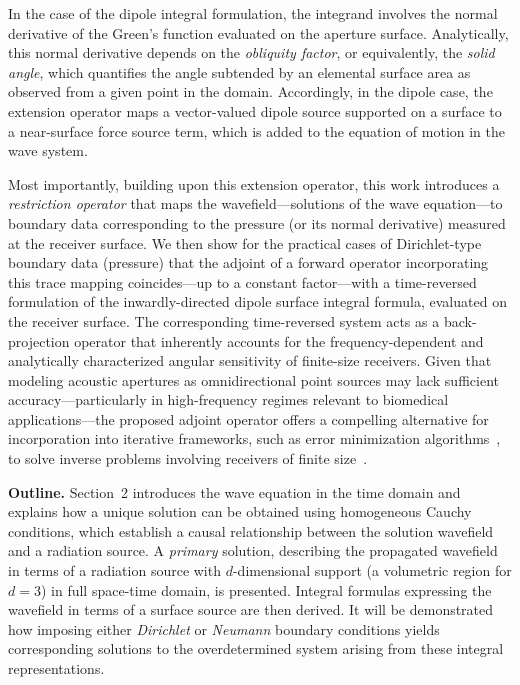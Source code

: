 \documentclass[11pt,reqno]{amsart}
\theoremstyle{remark}
\theoremstyle{italic_lemma}
\begin{document}
In the case of the dipole integral formulation, the integrand involves the normal derivative of the Green's function evaluated on the aperture surface. Analytically, this normal derivative depends on the \emph{obliquity factor}, or equivalently, the \emph{solid angle}, which quantifies the angle subtended by an elemental surface area as observed from a given point in the domain. Accordingly, in the dipole case, the extension operator maps a vector-valued dipole source supported on a surface to a near-surface force source term, which is added to the equation of motion in the wave system.


Most importantly, building upon this extension operator, this work introduces a \emph{restriction operator} that maps the wavefield—solutions of the wave equation—to boundary data corresponding to the pressure (or its normal derivative) measured at the receiver surface. We then show for the practical cases of Dirichlet-type
boundary data (pressure) that the adjoint of a forward operator incorporating this trace mapping coincides---up to a constant factor---with a time-reversed formulation of the inwardly-directed dipole surface integral formula, evaluated on the receiver surface. The corresponding time-reversed system acts as a back-projection operator that inherently accounts for the frequency-dependent and analytically characterized angular sensitivity of finite-size receivers. Given that modeling acoustic apertures as omnidirectional point sources may lack sufficient accuracy—particularly in high-frequency regimes relevant to biomedical applications—the proposed adjoint operator offers a compelling alternative for incorporation into iterative frameworks, such as error minimization algorithms~\cite{Qian,Dean-Ben,Haltmeier1,Datchev,Arridge,Javaherian1}, to solve inverse problems involving receivers of finite size~\cite{Xu,Burgholzer1}.



 \textbf{Outline.} Section~2 introduces the wave equation in the time domain and explains how a unique solution can be obtained using homogeneous Cauchy conditions, which establish a causal relationship between the solution wavefield and a radiation source. A \textit{primary} solution, describing the propagated wavefield in terms of a radiation source with $d$-dimensional support (a volumetric region for $d=3$) in full space-time domain, is presented. Integral formulas expressing the wavefield in terms of a surface source are then derived. It will be demonstrated how imposing either \textit{Dirichlet} or \textit{Neumann} boundary conditions yields corresponding solutions to the overdetermined system arising from these integral representations.
\end{document}
